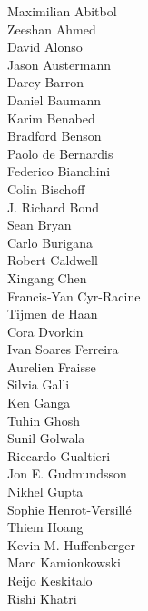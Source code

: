 \documentclass[PICOReport.tex]{subfiles}
\begin{document}
\footnotesize {
\begin{multicols}{4}
Maximilian Abitbol              \\
Zeeshan Ahmed                   \\
David Alonso                    \\
Jason Austermann                \\
Darcy Barron                    \\
Daniel Baumann                  \\
Karim Benabed                   \\
Bradford Benson                 \\
Paolo de Bernardis              \\
Federico Bianchini              \\
Colin Bischoff                  \\
J. Richard Bond                 \\
Sean Bryan                      \\
Carlo Burigana                  \\
Robert Caldwell                 \\
Xingang Chen                    \\
Francis-Yan Cyr-Racine          \\
Tijmen de Haan                  \\
Cora Dvorkin                    \\
Ivan Soares Ferreira            \\
Aurelien Fraisse                \\
Silvia Galli                    \\
Ken Ganga                       \\
Tuhin Ghosh                     \\
Sunil Golwala                   \\
Riccardo Gualtieri              \\
Jon E. Gudmundsson              \\
Nikhel Gupta                    \\
Sophie Henrot-Versill\'e        \\
Thiem Hoang                     \\
Kevin M. Huffenberger           \\
Marc Kamionkowski               \\
Reijo Keskitalo                 \\
Rishi Khatri                    \\

\end{multicols}}
\end{document}
